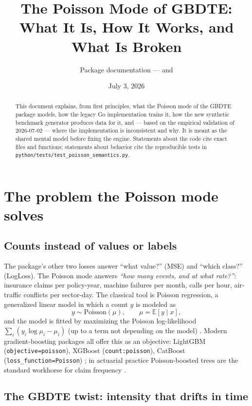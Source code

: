 \documentclass[11pt]{article}
\title{The Poisson Mode of GBDTE:\\ What It Is, How It Works, and What Is Broken}
\author{Package documentation --- \code{golang/poisson\_legacy} and\\
\code{python/extra\_boost\_py/experiments/poisson\_bench.py}}
\date{July 3, 2026}
\newcommand{\code}[1]{\texttt{\small #1}}
\begin{document}
\maketitle

\begin{abstract}
This document explains, from first principles, what the Poisson mode of the GBDTE
package models, how the legacy Go implementation trains it, how the new synthetic
benchmark generator produces data for it, and --- based on the empirical validation of
2026-07-02 --- where the implementation is inconsistent and why. It is meant as the
shared mental model before fixing the engine. Statements about the code cite exact
files and functions; statements about behavior cite the reproducible tests in
\code{python/tests/test\_poisson\_semantics.py}.
\end{abstract}

\section{The problem the Poisson mode solves}

\subsection{Counts instead of values or labels}

The package's other two losses answer ``what value?'' (MSE) and ``which class?''
(LogLoss). The Poisson mode answers \emph{``how many events, and at what rate?''}:
insurance claims per policy-year, machine failures per month, calls per hour, air-traffic
conflicts per sector-day. The classical tool is Poisson regression, a generalized linear
model in which a count $y$ is modeled as
\[
y \sim \mathrm{Poisson}(\mu), \qquad \mu = \mathbb{E}[y \mid x],
\]
and the model is fitted by maximizing the Poisson log-likelihood
$\sum_i \left( y_i \log \mu_i - \mu_i \right)$ (up to a term not depending on the model)
\cite{mccullagh1989,cameron2013}. Modern gradient-boosting packages all offer this as an
objective: LightGBM (\code{objective=poisson}), XGBoost (\code{count:poisson}), CatBoost
(\code{loss\_function=Poisson}) \cite{lgbmdocs,xgbdocs,cbdocs}; in actuarial practice
Poisson-boosted trees are the standard workhorse for claim frequency
\cite{ohlsson2010,denuit2020,wuthrich2023,yang2018}.

\subsection{The GBDTE twist: intensity that drifts in time}
\end{document}
